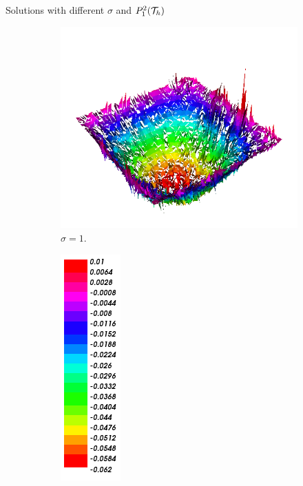 \begin{frame}{Solutions with different $\sigma$ and $\relax{P}_1^2(\mathcal{T}_h)$}
\begin{figure}[h!]
			\begin{subfigure}[b]{0.27\textwidth}
				\centering
				\includegraphics[scale=0.18]{img/Difusion/Recortes/steady_diffusion_approx_sigma_1.png}
				\caption{\scriptsize $\sigma=1$.}
			\end{subfigure}
			\begin{subfigure}[b]{0.15\textwidth}
				\centering
				\includegraphics[scale=0.23]{img/Difusion/Recortes/steady_diffusion_values.png}
			\end{subfigure}
			\begin{subfigure}[b]{0.27\textwidth}
				\centering

\end{subfigure}
\end{figure}
\end{frame}
